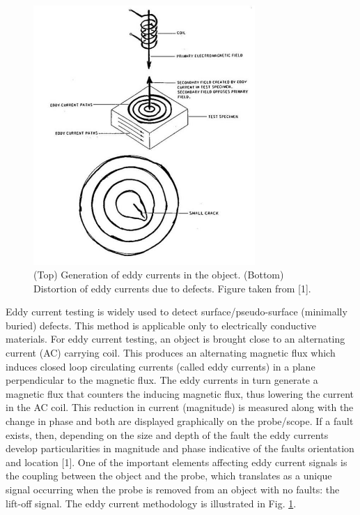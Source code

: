\documentclass[12pt]{article}
\begin{document}
\begin{figure}[h!]
  \centering
  	\includegraphics[width=0.75\textwidth]{image2}
  \caption{(Top) Generation of eddy currents in the object. (Bottom) Distortion of eddy currents due to defects. Figure taken from [1].}
  \label{fig:fig2}
\end{figure} 

Eddy current testing is widely used to detect surface/pseudo-surface (minimally buried) defects. This method is applicable only to electrically conductive materials. For eddy current testing, an object is brought close to an alternating current (AC) carrying coil. This produces an alternating magnetic flux which induces closed loop circulating currents (called eddy currents) in a plane perpendicular to the magnetic flux. The eddy currents in turn generate a magnetic flux that counters the inducing magnetic flux, thus lowering the current in the AC coil. This reduction in current (magnitude) is measured along with the change in phase and both are displayed graphically on the probe/scope. If a fault exists, then, depending on the size and depth of the fault the eddy currents develop particularities in magnitude and phase indicative of the faults orientation and location [1]. One of the important elements affecting eddy current signals is the coupling between the object and the probe, which translates as a unique signal occurring when the probe is removed from an object with no faults: the lift-off signal. The eddy current methodology is illustrated in Fig. \ref{fig:fig2}.
\end{document}
